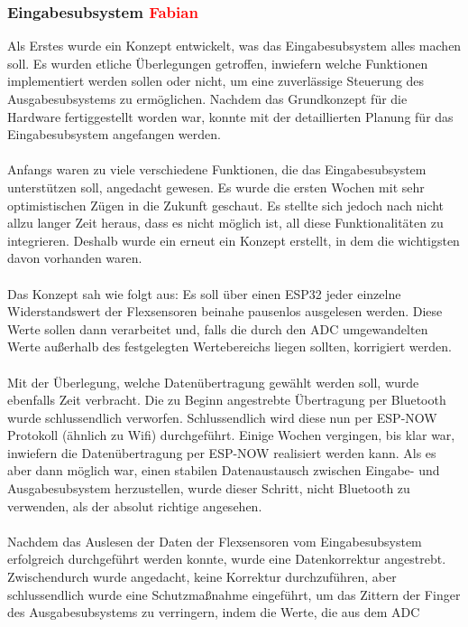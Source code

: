 \documentclass[titlepage,12pt,twoside]{article}
\begin{document}
\subsubsection{Eingabesubsystem \textcolor{red}{Fabian}}
Als Erstes wurde ein Konzept entwickelt, was das Eingabesubsystem alles machen 
soll. Es wurden etliche Überlegungen getroffen, inwiefern welche Funktionen 
implementiert werden sollen oder nicht, um eine zuverlässige Steuerung des 
Ausgabesubsystems zu ermöglichen. Nachdem das Grundkonzept für die Hardware 
fertiggestellt worden war, konnte mit der detaillierten Planung für das 
Eingabesubsystem angefangen werden. \\
\\
Anfangs waren zu viele verschiedene Funktionen, die das Eingabesubsystem 
unterstützen soll, angedacht gewesen. Es wurde die ersten Wochen mit sehr 
optimistischen Zügen in die Zukunft geschaut. Es stellte sich jedoch nach 
nicht allzu langer Zeit heraus, dass es nicht möglich ist, all diese 
Funktionalitäten zu integrieren. Deshalb wurde ein erneut ein Konzept erstellt, 
in dem die wichtigsten davon vorhanden waren. \\
\\ 
Das Konzept sah wie folgt aus: Es soll über einen ESP32 jeder einzelne 
Widerstandswert der Flexsensoren beinahe pausenlos ausgelesen werden. 
Diese Werte sollen dann verarbeitet und, falls die durch den ADC umgewandelten
Werte außerhalb des festgelegten Wertebereichs liegen sollten, korrigiert 
werden. \\
\\
Mit der Überlegung, welche Datenübertragung gewählt werden soll, wurde 
ebenfalls Zeit verbracht. Die zu Beginn angestrebte Übertragung per Bluetooth 
wurde schlussendlich verworfen. Schlussendlich wird diese nun per ESP-NOW 
Protokoll (ähnlich zu Wifi) durchgeführt. Einige Wochen vergingen, bis klar 
war, inwiefern die Datenübertragung per ESP-NOW realisiert werden kann. Als 
es aber dann möglich war, einen stabilen Datenaustausch zwischen Eingabe- und 
Ausgabesubsystem herzustellen, wurde dieser Schritt, nicht Bluetooth zu 
verwenden, als der absolut richtige angesehen. \\
\\
Nachdem das Auslesen der Daten der Flexsensoren vom Eingabesubsystem 
erfolgreich durchgeführt werden konnte, wurde eine Datenkorrektur angestrebt. 
Zwischendurch wurde angedacht, keine Korrektur durchzuführen, aber 
schlussendlich wurde eine Schutzmaßnahme eingeführt, um das Zittern der Finger 
des Ausgabesubsystems zu verringern, indem die Werte, die aus dem ADC 
\end{document}
